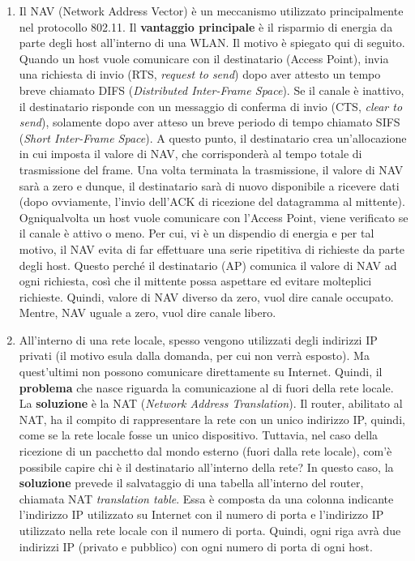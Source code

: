 \documentclass[a4paper]{article}
\begin{document}
	\begin{enumerate}
		\item Il NAV (Network Address Vector) è un meccanismo utilizzato principalmente nel protocollo 802.11. Il \textbf{vantaggio principale} è il risparmio di energia da parte degli host all'interno di una WLAN. Il motivo è spiegato qui di seguito.\newline
		Quando un host vuole comunicare con il destinatario (Access Point), invia una richiesta di invio (RTS, \emph{request to send}) dopo aver attesto un tempo breve chiamato DIFS (\emph{Distributed Inter-Frame Space}). Se il canale è inattivo, il destinatario risponde con un messaggio di conferma di invio (CTS, \emph{clear to send}), solamente dopo aver atteso un breve periodo di tempo chiamato SIFS (\emph{Short Inter-Frame Space}). A questo punto, il destinatario crea un'allocazione in cui imposta il valore di NAV, che corrisponderà al tempo totale di trasmissione del frame. Una volta terminata la trasmissione, il valore di NAV sarà a zero e dunque, il destinatario sarà di nuovo disponibile a ricevere dati (dopo ovviamente, l'invio dell'ACK di ricezione del datagramma al mittente).\newline
		Ogniqualvolta un host vuole comunicare con l'Access Point, viene verificato se il canale è attivo o meno. Per cui, vi è un dispendio di energia e per tal motivo, il NAV evita di far effettuare una serie ripetitiva di richieste da parte degli host. Questo perché il destinatario (AP) comunica il valore di NAV ad ogni richiesta, così che il mittente possa aspettare ed evitare molteplici richieste.\newline
		Quindi, valore di NAV diverso da zero, vuol dire canale occupato. Mentre, NAV uguale a zero, vuol dire canale libero.\newpage
		
		\item All'interno di una rete locale, spesso vengono utilizzati degli indirizzi IP privati (il motivo esula dalla domanda, per cui non verrà esposto). Ma quest'ultimi non possono comunicare direttamente su Internet. Quindi, il \textbf{problema} che nasce riguarda la comunicazione al di fuori della rete locale.\newline
		La \textbf{soluzione} è la NAT (\emph{Network Address Translation}). Il router, abilitato al NAT, ha il compito di rappresentare la rete con un unico indirizzo IP, quindi, come se la rete locale fosse un unico dispositivo. Tuttavia, nel caso della ricezione di un pacchetto dal mondo esterno (fuori dalla rete locale), com'è possibile capire chi è il destinatario all'interno della rete?\newline
		In questo caso, la \textbf{soluzione} prevede il salvataggio di una tabella all'interno del router, chiamata NAT \emph{translation table}. Essa è composta da una colonna indicante l'indirizzo IP utilizzato su Internet con il numero di porta e l'indirizzo IP utilizzato nella rete locale con il numero di porta. Quindi, ogni riga avrà due indirizzi IP (privato e pubblico) con ogni numero di porta di ogni host.
		

\end{enumerate}
\end{document}
